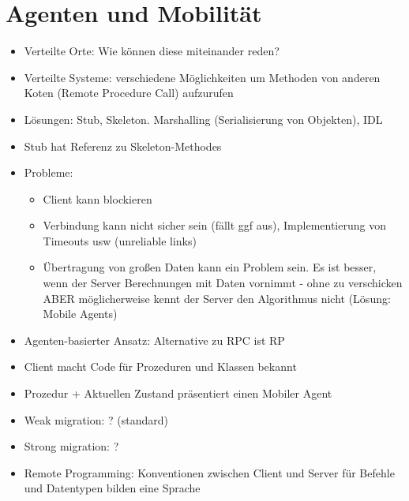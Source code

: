 \documentclass{article} %
\begin{document}
	\section{Agenten und Mobilität}
	\begin{itemize}
		\item Verteilte Orte: Wie können diese miteinander reden?
		\item Verteilte Systeme: verschiedene Möglichkeiten um Methoden von anderen Koten (Remote Procedure Call) aufzurufen
		\item Lösungen: Stub, Skeleton. Marshalling (Serialisierung von Objekten), IDL
		\item Stub hat Referenz zu Skeleton-Methodes
		\item Probleme: 
		\begin{itemize}
			\item Client kann blockieren
			\item Verbindung kann nicht sicher sein (fällt ggf aus), Implementierung von Timeouts usw (unreliable links)
			\item Übertragung von großen Daten kann ein Problem sein. Es ist besser, wenn der Server Berechnungen mit Daten vornimmt - ohne zu verschicken ABER möglicherweise kennt der Server den Algorithmus nicht (Lösung: Mobile Agents)
		\end{itemize}
		\item Agenten-basierter Ansatz: Alternative zu RPC ist RP
		\item Client macht Code für Prozeduren und Klassen bekannt
		\item Prozedur + Aktuellen Zustand präsentiert einen Mobiler Agent
		\item Weak migration: ? (standard)
		\item Strong migration: ?
		\item Remote Programming: Konventionen zwischen Client und Server für Befehle und Datentypen bilden eine Sprache
	\end{itemize}
\end{document}
